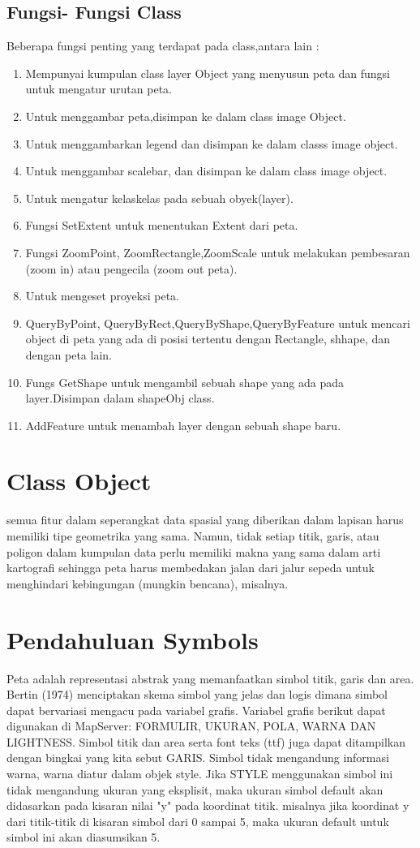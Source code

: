 \subsection {Fungsi- Fungsi Class}
Beberapa fungsi penting yang terdapat pada class,antara lain :
\begin{enumerate}
\item Mempunyai kumpulan class layer Object yang menyusun peta dan fungsi untuk mengatur urutan peta.
\item Untuk menggambar peta,disimpan ke dalam class image Object.
\item Untuk menggambarkan legend dan disimpan ke dalam classs image object.
\item Untuk menggambar scalebar, dan disimpan ke dalam class image object.
\item Untuk mengatur kelaskelas pada sebuah obyek(layer).
\item Fungsi SetExtent untuk menentukan Extent dari peta.
\item Fungsi ZoomPoint, ZoomRectangle,ZoomScale untuk melakukan pembesaran (zoom in) atau pengecila (zoom out peta).
\item Untuk mengeset proyeksi peta.
\item QueryByPoint, QueryByRect,QueryByShape,QueryByFeature untuk mencari object di peta yang ada di posisi tertentu dengan Rectangle, shhape, dan dengan peta lain.
\item Fungs GetShape untuk mengambil sebuah shape yang ada pada layer.Disimpan dalam shapeObj class.
\item AddFeature untuk menambah layer dengan sebuah shape baru.
\end{enumerate}

\section{Class Object}
    semua fitur dalam seperangkat data spasial yang diberikan dalam lapisan harus memiliki tipe geometrika yang sama. Namun, tidak setiap titik, garis, atau poligon dalam kumpulan data perlu memiliki makna yang sama dalam arti kartografi sehingga peta harus membedakan jalan dari jalur sepeda untuk menghindari kebingungan (mungkin bencana), misalnya.

\section {Pendahuluan Symbols}
    Peta adalah representasi abstrak yang memanfaatkan simbol titik, garis dan area. Bertin (1974) menciptakan skema simbol yang jelas dan logis dimana simbol dapat bervariasi mengacu pada variabel grafis. Variabel grafis berikut dapat digunakan di MapServer: FORMULIR, UKURAN, POLA, WARNA DAN LIGHTNESS. Simbol titik dan area serta font teks (ttf) juga dapat ditampilkan dengan bingkai yang kita sebut GARIS. Simbol tidak mengandung informasi warna, warna diatur dalam objek style. Jika STYLE menggunakan simbol ini tidak mengandung ukuran yang eksplisit, maka ukuran simbol default akan didasarkan pada kisaran nilai "y" pada koordinat titik. misalnya jika koordinat y dari titik-titik di kisaran simbol dari 0 sampai 5, maka ukuran default untuk simbol ini akan diasumsikan 5.
    
